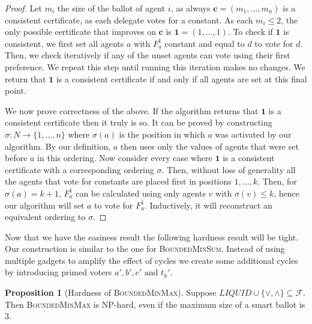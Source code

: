 \documentclass[11pt,a4paper, titlepage]{article}
\theoremstyle{definition}
\newtheorem{proposition}[theorem]{Proposition}
\let\vec\mathbf
\newcommand{\BMS}{\textsc{BoundedMinSum}}
\begin{document}
\begin{proof}
    Let $m_i$ the size of the ballot of agent $i$, as always $\vec{c} = (m_1, \ldots, m_n)$ is a consistent certificate, as each delegate votes for a constant.
    As each $m_i \leq 2$, the only possible certificate that improves on $\vec{c}$ is $\vec{1} = (1, \ldots, 1)$.
    To check if $\vec{1}$ is consistent, we first set all agents $a$ with $F_a^1$ constant and equal to $d$ to vote for $d$.
    Then, we check iteratively if any of the unset agents can vote using their first preference.
    We repeat this step until running this iteration makes no changes.
    We return that $\vec{1}$ is a consistent certificate if and only if all agents are set at this final point.

    We now prove correctness of the above.
    If the algorithm returns that $\vec{1}$ is a consistent certificate then it truly is so. 
    It can be proved by constructing $\sigma \colon N \longrightarrow \{1,\ldots, n\}$ where $\sigma(a)$ is the position in which $a$ was activated by our algorithm.
    By our definition, $a$ then uses only the values of agents that were set before $a$ in this ordering.
    Now consider every case where $\vec{1}$ is a consistent certificate with a corresponding ordering $\sigma$.
    Then, without loss of generality all the agents that vote for constants are placed first in positions $1, \ldots, k$.
    Then, for $\sigma(a) = k+1$, $F_a^{1}$ can be calculated using only agents $v$ with $\sigma(v) \leq k$, hence our algorithm will set $a$ to vote for $F_a^1$. Inductively, it will reconstruct an equivalent ordering to $\sigma$.

\end{proof}

Now that we have the easiness result the following hardness result will be tight.
Our construction is similar to the one for \BMS.
Instead of using multiple gadgets to amplify the effect of cycles we create some additional cycles by introducing primed voters $a', b', c' \text{ and } t_h'$.

\begin{proposition}[Hardness of \textsc{BoundedMinMax}]
    Suppose $\mathit{LIQUID} \cup \{\lor, \land\} \subseteq \mathcal{F}$. Then \textsc{BoundedMinMax} is NP-hard, even if the maximum size of a smart ballot is 3.    
\end{proposition}
\end{document}
